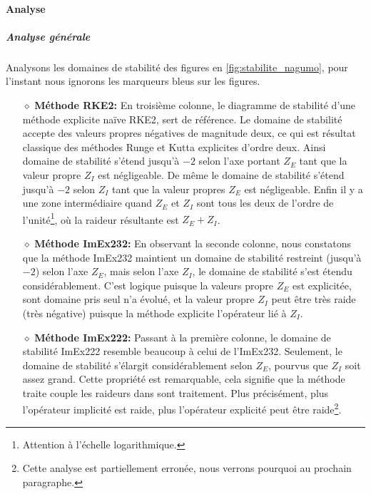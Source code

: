         \paragraph{Analyse}
            \subparagraph{Analyse générale}
            Analysons les domaines de stabilité des figures en \ref{fig:stabilite_nagumo}, pour l'instant nous ignorons les marqueurs bleus sur les figures.
            \begin{itemize}
                \item[$\diamond$]\textbf{Méthode RKE2:} En troisième colonne, le diagramme de stabilité d'une méthode explicite naïve RKE2, sert de référence. 
                    Le domaine de stabilité accepte des valeurs propres négatives de magnitude deux, ce qui est résultat classique des méthodes Runge et Kutta explicites d'ordre deux.
                    Ainsi domaine de stabilité s'étend jusqu'à $-2$ selon l'axe portant $Z_E$ tant que la valeur propre $Z_I$ est négligeable.
                    De même le domaine de stabilité s'étend jusqu'à $-2$ selon $Z_I$ tant que la valeur propres $Z_E$ est négligeable. 
                    Enfin il y a une zone intermédiaire quand $Z_E$ et $Z_I$ sont tous les deux de l'ordre de l'unité\footnote{Attention à l'échelle logarithmique.},
                    où la raideur résultante est $Z_E+Z_I$.

                \item[$\diamond$]\textbf{Méthode ImEx232:} En observant la seconde colonne, nous constatons que la méthode ImEx232 maintient un domaine de stabilité restreint (jusqu'à $-2$) selon l'axe $Z_E$,
                    mais selon l'axe $Z_I$, le domaine de stabilité s'est étendu considérablement. C'est logique puisque la valeurs propre $Z_E$ est explicitée,
                    sont domaine pris seul n'a évolué, et la valeur propre $Z_I$ peut être très raide (très négative) puisque la méthode explicite l'opérateur lié à $Z_I$.

                \item[$\diamond$]\textbf{Méthode ImEx222:} Passant à la première colonne, le domaine de stabilité ImEx222 resemble beaucoup à celui de l'ImEx232. Seulement, le domaine de stabilité s'élargit considérablement
                    selon $Z_E$, pourvus que $Z_I$ soit assez grand. Cette propriété est remarquable, cela signifie que la méthode traite couple les raideurs dans sont traitement. 
                    Plus précisément, plus l'opérateur implicité est raide, plus l'opérateur explicité peut être raide\footnote{Cette analyse est partiellement erronée, nous verrons 
                    pourquoi au prochain paragraphe.}.
            \end{itemize}
